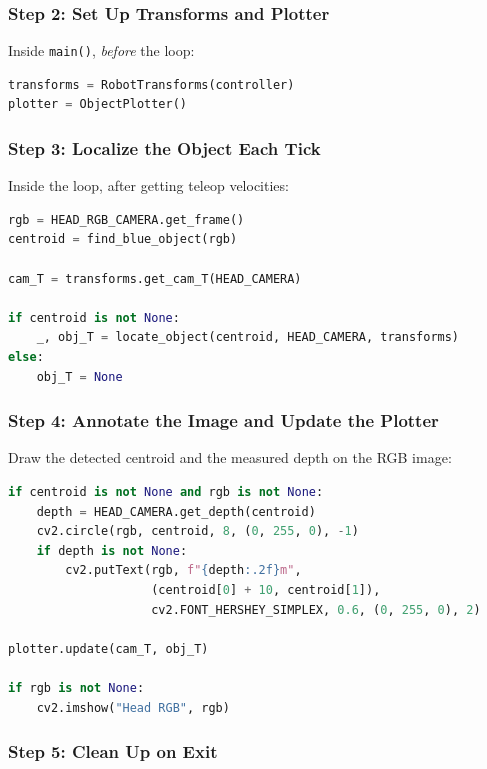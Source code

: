 \documentclass[11pt,a4paper]{article}
\begin{document}
\subsubsection*{Step 2: Set Up Transforms and Plotter}

Inside \texttt{main()}, \emph{before} the loop:

\begin{lstlisting}[language=Python]
transforms = RobotTransforms(controller)
plotter = ObjectPlotter()
\end{lstlisting}

\subsubsection*{Step 3: Localize the Object Each Tick}

Inside the loop, after getting teleop velocities:

\begin{lstlisting}[language=Python]
rgb = HEAD_RGB_CAMERA.get_frame()
centroid = find_blue_object(rgb)

cam_T = transforms.get_cam_T(HEAD_CAMERA)

if centroid is not None:
    _, obj_T = locate_object(centroid, HEAD_CAMERA, transforms)
else:
    obj_T = None
\end{lstlisting}

\subsubsection*{Step 4: Annotate the Image and Update the Plotter}

Draw the detected centroid and the measured depth on the RGB image:

\begin{lstlisting}[language=Python]
if centroid is not None and rgb is not None:
    depth = HEAD_CAMERA.get_depth(centroid)
    cv2.circle(rgb, centroid, 8, (0, 255, 0), -1)
    if depth is not None:
        cv2.putText(rgb, f"{depth:.2f}m",
                    (centroid[0] + 10, centroid[1]),
                    cv2.FONT_HERSHEY_SIMPLEX, 0.6, (0, 255, 0), 2)

plotter.update(cam_T, obj_T)

if rgb is not None:
    cv2.imshow("Head RGB", rgb)
\end{lstlisting}

\subsubsection*{Step 5: Clean Up on Exit}
\end{document}
